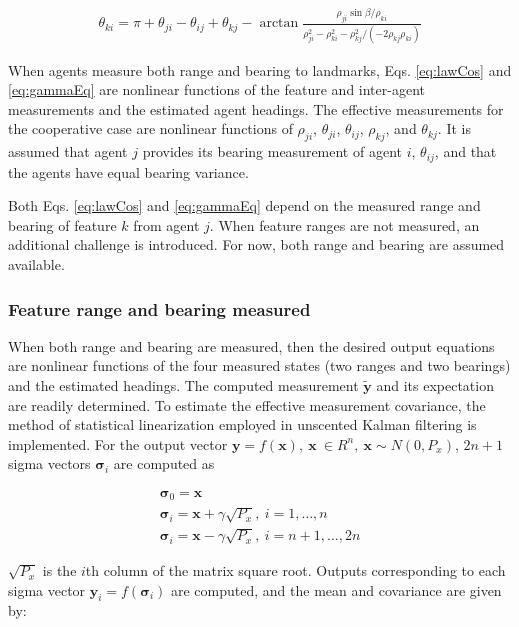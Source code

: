 \documentclass{aiaa-tc}
\newcommand{\B}[1]{\textbf{#1}} %
\newcommand{\BG}[1]{{\bm #1}}           %
\begin{document}
\begin{align}
\theta_{ki} = \pi + \theta_{ji} - \theta_{ij} +\theta_{kj} - \arctan{ \frac{\rho_{ji}\sin{\beta}/\rho_{ki}}{\rho_{ji}^2-\rho_{ki}^2-\rho_{kj}^2 /(-2\rho_{kj}\rho_{ki})} }
\label{eq:gammaEq}
\end{align}

When agents measure both range and bearing to landmarks, Eqs. \ref{eq:lawCos} and \ref{eq:gammaEq} are nonlinear functions of the feature and inter-agent measurements and the estimated agent headings. The effective measurements for the cooperative case are nonlinear functions of $\rho_{ji}$, $\theta_{ji}$, $\theta_{ij}$, $\rho_{kj}$, and $\theta_{kj}$. It is assumed that agent $j$ provides its bearing measurement of agent $i$, $\theta_{ij}$, and that the agents have equal bearing variance.

Both Eqs. \ref{eq:lawCos} and \ref{eq:gammaEq} depend on the measured range and bearing of feature $k$ from agent $j$. When feature ranges are not measured, an additional challenge is introduced. For now, both range and bearing are assumed available.

\subsubsection{Feature range and bearing measured}

When both range and bearing are measured, then the desired output equations are nonlinear functions of the four measured states (two ranges and two bearings) and the estimated headings. The computed measurement $\tilde{\B{y}}$ and its expectation are readily determined. To estimate the effective measurement covariance, the method of statistical linearization employed in unscented Kalman filtering is implemented. For the output vector $\B{y} = f(\B{x}), \ \B{x} \ \in \mathit{R}^n, \ \B{x} \sim N(0,P_x)$, $2n+1$ sigma vectors $\BG{\sigma}_i$ are computed as

\begin{align}
\BG{\sigma}_0 = \B{x} \\
\BG{\sigma}_i = \B{x} + \gamma \sqrt{P_x}, \ i = 1,\dots,n \\
\BG{\sigma}_i = \B{x} - \gamma \sqrt{P_x},\ i = n+1,\dots,2n
\end{align}

$\sqrt{P_x}$ is the $i$th column of the matrix square root. Outputs corresponding to each sigma vector $\B{y}_i = f(\BG{\sigma}_i)$ are computed, and the mean and covariance are given by:
\end{document}
